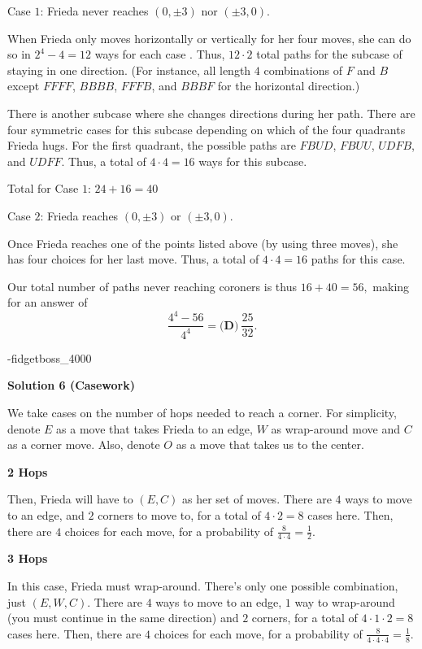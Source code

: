 \begin{enumerate}
 Case $1$: Frieda never reaches $(0, \pm 3)$ nor $(\pm 3, 0).$

 When Frieda only moves horizontally or vertically for her four moves, she can do so in $2^4 - 4 = 12$ ways for each case . Thus, $12 \cdot 2$ total paths for the subcase of staying in one direction. (For instance, all length $4$ combinations of $F$ and $B$ except $FFFF$, $BBBB$, $FFFB$, and $BBBF$ for the horizontal direction.) 

 There is another subcase where she changes directions during her path. There are four symmetric cases for this subcase depending on which of the four quadrants Frieda hugs. For the first quadrant, the possible paths are $FBUD$, $FBUU$, $UDFB$, and $UDFF.$ Thus, a total of $4 \cdot 4 = 16$ ways for this subcase. 

 Total for Case $1$: $24 + 16 = 40$

 Case $2$: Frieda reaches $(0, \pm 3)$ or $(\pm 3, 0)$.

 Once Frieda reaches one of the points listed above (by using three moves), she has four choices for her last move. Thus, a total of $4 \cdot 4 = 16$ paths for this case.

 Our total number of paths never reaching coroners is thus $16+40=56,$ making for an answer of 
 \[\frac{4^4-56}{4^4} = \boxed{\textbf{(D)} ~\frac{25}{32}}.\]

 -fidgetboss\_4000

 



\textbf{Solution 6 (Casework)}

We take cases on the number of hops needed to reach a corner. For simplicity, denote $E$ as a move that takes Frieda to an edge, $W$ as wrap-around move and $C$ as a corner move. Also, denote $O$ as a move that takes us to the center.

 \textbf{ 2 Hops }

 Then, Frieda will have to $(E, C)$ as her set of moves. There are $4$ ways to move to an edge, and $2$ corners to move to, for a total of $4 \cdot 2 = 8$ cases here. Then, there are $4$ choices for each move, for a probability of $\frac{8}{4 \cdot 4} = \frac{1}{2}$. 

 \textbf{ 3 Hops }

 In this case, Frieda must wrap-around. There's only one possible combination, just $(E, W, C)$. There are $4$ ways to move to an edge, $1$ way to wrap-around (you must continue in the same direction) and $2$ corners, for a total of $4 \cdot 1 \cdot 2 = 8$ cases here. Then, there are $4$ choices for each move, for a probability of $\frac{8}{4 \cdot 4 \cdot 4} = \frac{1}{8}$. 


\end{enumerate}
